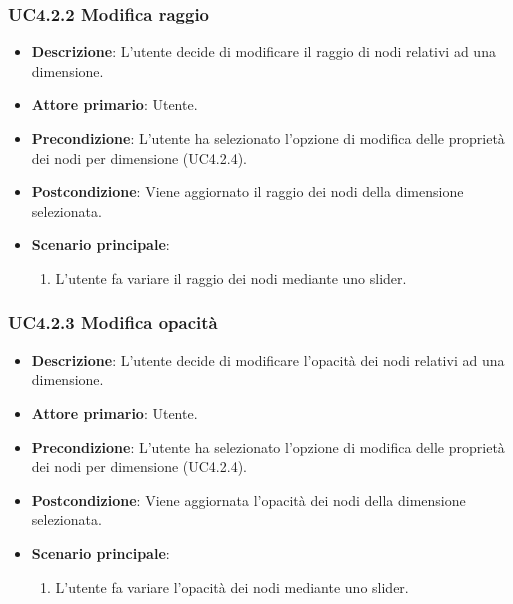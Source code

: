 \subsubsection{UC4.2.2 Modifica raggio}
\label{subsec:uc4.2.2}
\begin{itemize}
    \item \textbf{Descrizione}: L'utente decide di modificare il raggio di nodi relativi ad una dimensione.
	
    \item \textbf{Attore primario}: Utente.
    
    \item \textbf{Precondizione}:   L'utente ha selezionato l'opzione di modifica delle proprietà dei nodi per dimensione (UC4.2.4).
    \item \textbf{Postcondizione}:  Viene aggiornato il raggio dei nodi della dimensione selezionata.

	\item \textbf{Scenario principale}:
        \begin{enumerate}
            \item L'utente fa variare il raggio dei nodi mediante uno slider.
        \end{enumerate}
\end{itemize}

\subsubsection{UC4.2.3 Modifica opacità}
\label{subsec:uc4.2.3}
\begin{itemize}
    \item \textbf{Descrizione}:  L'utente decide di modificare l'opacità dei nodi relativi ad una dimensione.

	
    \item \textbf{Attore primario}: Utente.

    \item \textbf{Precondizione}: L'utente ha selezionato l'opzione di modifica delle proprietà dei nodi per dimensione (UC4.2.4).
    \item \textbf{Postcondizione}:  Viene aggiornata l'opacità dei nodi della dimensione selezionata.

	\item \textbf{Scenario principale}:
        \begin{enumerate}
            \item L'utente fa variare l'opacità dei nodi mediante uno slider.
        \end{enumerate}
\end{itemize}


